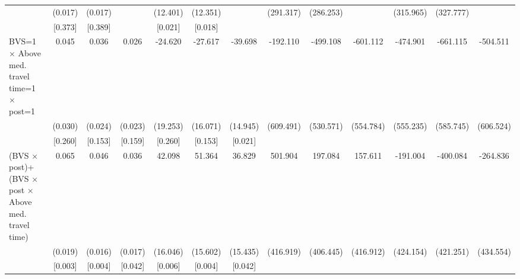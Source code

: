 {\begin{tabular}{l*{12}{c}}
                    &     (0.017)         &     (0.017)         &                     &    (12.401)         &    (12.351)         &                     &   (291.317)         &   (286.253)         &                     &   (315.965)         &   (327.777)         &                     \\
                    &     [0.373]         &     [0.389]         &                     &     [0.021]         &     [0.018]         &                     &                     &                     &                     &                     &                     &                     \\
BVS=1 $\times$ Above med. travel time=1 $\times$ post=1&       0.045         &       0.036         &       0.026         &     -24.620         &     -27.617\sym{*}  &     -39.698\sym{**} &    -192.110         &    -499.108         &    -601.112         &    -474.901         &    -661.115         &    -504.511         \\
                    &     (0.030)         &     (0.024)         &     (0.023)         &    (19.253)         &    (16.071)         &    (14.945)         &   (609.491)         &   (530.571)         &   (554.784)         &   (555.235)         &   (585.745)         &   (606.524)         \\
                    &     [0.260]         &     [0.153]         &     [0.159]         &     [0.260]         &     [0.153]         &     [0.021]         &                     &                     &                     &                     &                     &                     \\
\hline (BVS $\times$ post)+(BVS $\times$  post $\times$ Above med. travel time)&       0.065\sym{***}&       0.046\sym{***}&       0.036\sym{**} &      42.098\sym{**} &      51.364\sym{***}&      36.829\sym{**} &     501.904         &     197.084         &     157.611         &    -191.004         &    -400.084         &    -264.836         \\
                    &     (0.019)         &     (0.016)         &     (0.017)         &    (16.046)         &    (15.602)         &    (15.435)         &   (416.919)         &   (406.445)         &   (416.912)         &   (424.154)         &   (421.251)         &   (434.554)         \\
                    &     [0.003]         &     [0.004]         &     [0.042]         &     [0.006]         &     [0.004]         &     [0.042]         &                     &                     &                     &                     &                     &                     \\

\end{tabular}}
